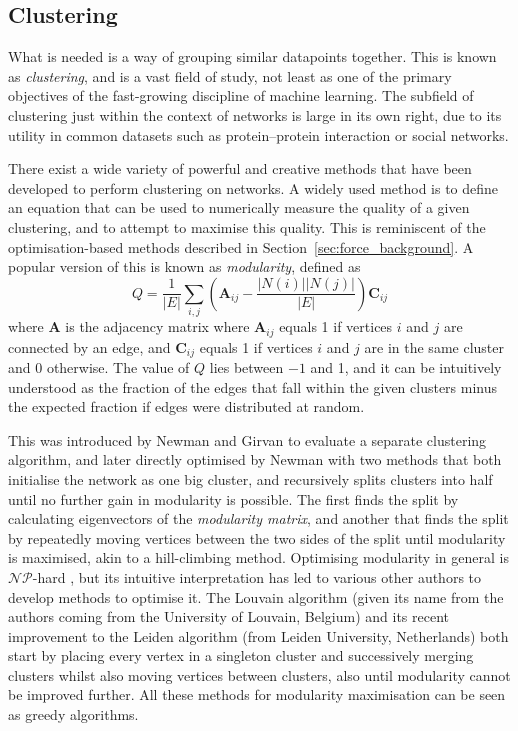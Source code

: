 \subsection{Clustering}
What is needed is a way of grouping similar datapoints together. This is known as \textit{clustering}, and is a vast field of study, not least as one of the primary objectives of the fast-growing discipline of machine learning. The subfield of clustering just within the context of networks is large in its own right, due to its utility in common datasets such as protein--protein interaction or social networks.

There exist a wide variety of powerful and creative methods that have been developed to perform clustering on networks. A widely used method is to define an equation that can be used to numerically measure the quality of a given clustering, and to attempt to maximise this quality. This is reminiscent of the optimisation-based methods described in Section~\ref{sec:force_background}.
A popular version of this is known as \emph{modularity}, defined as
\begin{equation}
Q = \frac{1}{|E|}\sum_{i,j}\left(\mathbf{A}_{ij} - \frac{|N(i)||N(j)|}{|E|}\right)\mathbf{C}_{ij}
\label{eq:modularity}
\end{equation}
where $\mathbf{A}$ is the adjacency matrix where $\mathbf{A}_{ij}$ equals 1 if vertices $i$ and $j$ are connected by an edge, and $\mathbf{C}_{ij}$ equals 1 if vertices $i$ and $j$ are in the same cluster and 0 otherwise.
The value of $Q$ lies between $-1$ and 1, and it can be intuitively understood as the fraction of the edges that fall within the given clusters minus the expected fraction if edges were distributed at random.

This was introduced by Newman and Girvan \cite{Newman2004} to evaluate a separate clustering algorithm, and later directly optimised by Newman \cite{Newman2006} with two methods that both initialise the network as one big cluster, and recursively splits clusters into half until no further gain in modularity is possible. The first finds the split by calculating eigenvectors of the \emph{modularity matrix}, and another that finds the split by repeatedly moving vertices between the two sides of the split until modularity is maximised, akin to a hill-climbing method.
Optimising modularity in general is $\mathcal{NP}$-hard \cite{Brandes2007a}, but its intuitive interpretation has led to various other authors to develop methods to optimise it. The Louvain algorithm (given its name from the authors coming from the University of Louvain, Belgium) \cite{Blondel2008} and its recent improvement to the Leiden algorithm (from Leiden University, Netherlands) \cite{Traag2019} both start by placing every vertex in a singleton cluster and successively merging clusters whilst also moving vertices between clusters, also until modularity cannot be improved further.
All these methods for modularity maximisation can be seen as greedy algorithms.

